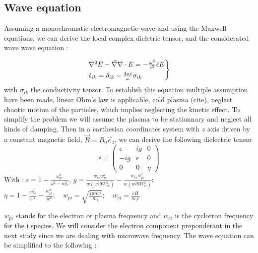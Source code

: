 \documentclass[11pt,a4paper,openany]{report}
\begin{document}
\begin{multicols}{2}
    \subsection{Wave equation}
    Assuming a monochromatic electromagnetic-wave and using the Maxwell equations, we can derive the local complex dieletric tensor, and the considerated wave wave equation :

    \begin{equation}
        \begin{rcases}
            \laplacian E -  \vec{\nabla}\nabla \cdot E = -\frac{\omega^2}{c^2} \hat{\epsilon} E \\
            \hat{\epsilon}_{ik} = \delta _{ik} - \frac{4\pi i}{\omega} \sigma_{ik}
        \end{rcases}
    \end{equation}
    with $\sigma_{ik}$ the conductivity tensor. To establish this equation multiple assumption have been made, linear Ohm's law is applicable, cold plasma (cite), neglect chaotic motion of the particles, which implies neglecting the kinetic effect. To simplify the problem we will assume the plasma to be stationnary and neglect all kinds of damping. Then in a carthesian coordinates system with $z$ axis driven by a constant magnetic field,
    $\vec{B} = B_0\vec{e}_z$, we can derive the following dielectric tensor\cite{Thomas H.Stix}
    $$\hat{\epsilon} = \begin{pmatrix}
            \epsilon & ig       & 0    \\
            -ig      & \epsilon & 0    \\
            0        & 0        & \eta
        \end{pmatrix}$$
    With : $\epsilon = 1 - \frac{\omega_{pe}^2}{\omega^2 - w_{ce}^2}$, $g = \frac{w_{ce}w_{pe}^2}{w(w^2 9 W_{ce}^2)} - \frac{w_{ci}w_{pi}^2}{w(w^2 9 W_{ci}^2)}$;
    $ \eta  = 1 - \frac{w_{pe}^2}{w^2} -  \frac{w_{pi}^2}{w^2}; \quad w_{pi} = \sqrt{\frac{4\pi n e^2}{m_i}}; \quad w_{ci} = \frac{eH}{m_i c}$

    $w_{pi}$ stands for the electron or plasma frequency and $w_{ci}$ is the cyclotron frequency for the i species. We will consider the electron component preponderant in the next study since we are dealing with microwave frequency. The wave equation can be simplified to the following :


\end{multicols}
\end{document}
